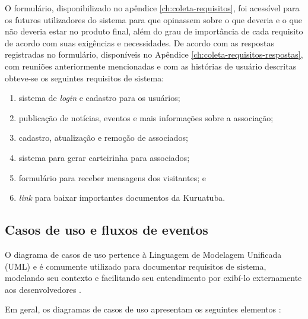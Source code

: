 O formulário, disponibilizado no apêndice \ref{ch:coleta-requisitos}, foi acessível para os futuros utilizadores do sistema para que opinassem sobre o que deveria e o que não deveria estar no produto final, além do grau de importância de cada requisito de acordo com suas exigências e necessidades. De acordo com as respostas registradas no formulário, disponíveis no Apêndice \ref{ch:coleta-requisitos-respostas}, com reuniões anteriormente mencionadas e com as histórias de usuário descritas obteve-se os seguintes requisitos de sistema:

\begin{enumerate}
 \item sistema de \textit{login} e cadastro para os usuários;
 \item publicação de notícias, eventos e mais informações sobre a associação;
 \item cadastro, atualização e remoção de associados;
 \item sistema para gerar carteirinha para associados;
 \item formulário para receber mensagens dos visitantes; e
 \item \textit{link} para baixar importantes documentos da Kuruatuba.
\end{enumerate}


\hspace{2.5cm}
\subsection{Casos de uso e fluxos de eventos}
\label{subsec:usecase}
\hspace{2.5cm}

O diagrama de casos de uso pertence à Linguagem de Modelagem Unificada (UML) e é comumente utilizado para documentar requisitos de sistema, modelando seu contexto e facilitando seu entendimento por exibí-lo externamente aos desenvolvedores \cite{de2001diagramas}.

Em geral, os diagramas de casos de uso apresentam os seguintes elementos \cite{zapata2007conversion}:

